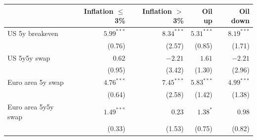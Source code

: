 \begin{tabular}{lrrrr}
\toprule
 & Inflation $\leq$ 3\% & Inflation $>$ 3\% & Oil up & Oil down\\
\midrule
US 5y breakeven & $5.99^{***}$ & $8.34^{***}$ & $5.31^{***}$ & $8.19^{***}$\\
 & {\footnotesize (0.76)} & {\footnotesize (2.57)} & {\footnotesize (0.85)} & {\footnotesize (1.71)}\\
US 5y5y swap & $0.62$ & $-2.21$ & $1.61$ & $-2.21$\\
 & {\footnotesize (0.95)} & {\footnotesize (3.42)} & {\footnotesize (1.30)} & {\footnotesize (2.96)}\\
Euro area 5y swap & $4.76^{***}$ & $7.45^{***}$ & $5.83^{***}$ & $4.99^{***}$\\
 & {\footnotesize (0.64)} & {\footnotesize (2.58)} & {\footnotesize (1.42)} & {\footnotesize (1.38)}\\
Euro area 5y5y swap & $1.49^{***}$ & $0.23$ & $1.38^{*}$ & $0.98$\\
 & {\footnotesize (0.33)} & {\footnotesize (1.53)} & {\footnotesize (0.75)} & {\footnotesize (0.82)}\\
\bottomrule
\end{tabular}